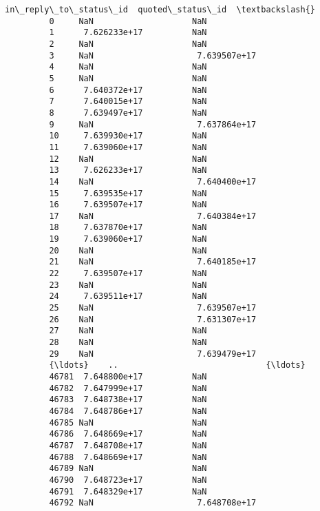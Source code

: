 \documentclass[11pt]{article}
\begin{document}
\begin{Verbatim}[commandchars=\\\{\}]
                in\_reply\_to\_status\_id  quoted\_status\_id  \textbackslash{}
         0     NaN                    NaN                 
         1      7.626233e+17          NaN                 
         2     NaN                    NaN                 
         3     NaN                     7.639507e+17       
         4     NaN                    NaN                 
         5     NaN                    NaN                 
         6      7.640372e+17          NaN                 
         7      7.640015e+17          NaN                 
         8      7.639497e+17          NaN                 
         9     NaN                     7.637864e+17       
         10     7.639930e+17          NaN                 
         11     7.639060e+17          NaN                 
         12    NaN                    NaN                 
         13     7.626233e+17          NaN                 
         14    NaN                     7.640400e+17       
         15     7.639535e+17          NaN                 
         16     7.639507e+17          NaN                 
         17    NaN                     7.640384e+17       
         18     7.637870e+17          NaN                 
         19     7.639060e+17          NaN                 
         20    NaN                    NaN                 
         21    NaN                     7.640185e+17       
         22     7.639507e+17          NaN                 
         23    NaN                    NaN                 
         24     7.639511e+17          NaN                 
         25    NaN                     7.639507e+17       
         26    NaN                     7.631307e+17       
         27    NaN                    NaN                 
         28    NaN                    NaN                 
         29    NaN                     7.639479e+17       
         {\ldots}    ..                              {\ldots}       
         46781  7.648800e+17          NaN                 
         46782  7.647999e+17          NaN                 
         46783  7.648738e+17          NaN                 
         46784  7.648786e+17          NaN                 
         46785 NaN                    NaN                 
         46786  7.648669e+17          NaN                 
         46787  7.648708e+17          NaN                 
         46788  7.648669e+17          NaN                 
         46789 NaN                    NaN                 
         46790  7.648723e+17          NaN                 
         46791  7.648329e+17          NaN                 
         46792 NaN                     7.648708e+17       

\end{Verbatim}
\end{document}
